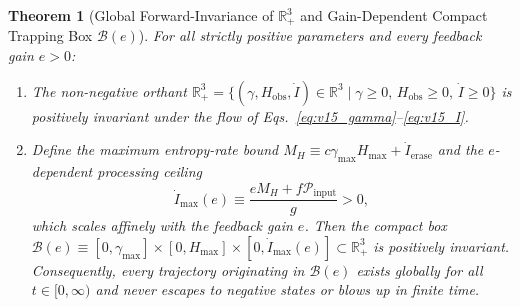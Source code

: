 \documentclass[11pt,a4paper]{article}
\newtheorem{theorem}{Theorem}
\theoremstyle{remark}
\begin{document}
\begin{theorem}[Global Forward-Invariance of $\mathbb{R}^3_+$ and Gain-Dependent Compact Trapping Box $\mathcal{B}(e)$]
\label{thm:global_invariance}
For all strictly positive parameters and every feedback gain $e > 0$:
\begin{enumerate}
\setlength{\itemsep}{1pt}\setlength{\parskip}{0pt}
    \item The non-negative orthant $\mathbb{R}^3_+ = \{(\gamma, H_{\text{obs}}, \dot{I}) \in \mathbb{R}^3 \mid \gamma \ge 0,\, H_{\text{obs}} \ge 0,\, \dot{I} \ge 0\}$ is positively invariant under the flow of Eqs.~\eqref{eq:v15_gamma}--\eqref{eq:v15_I}.
    \item Define the maximum entropy-rate bound $M_H \equiv c\gamma_{\max}H_{\max} + \dot{I}_{\text{erase}}$ and the $e$-dependent processing ceiling
    \begin{equation}
    \label{eq:I_max}
    \dot{I}_{\max}(e) \equiv \frac{e M_H + f\mathcal{P}_{\text{input}}}{g} > 0,
    \end{equation}
    which scales affinely with the feedback gain $e$. Then the compact box $\mathcal{B}(e) \equiv [0, \gamma_{\max}] \times [0, H_{\max}] \times [0, \dot{I}_{\max}(e)] \subset \mathbb{R}^3_+$ is positively invariant. Consequently, every trajectory originating in $\mathcal{B}(e)$ exists globally for all $t \in [0,\infty)$ and never escapes to negative states or blows up in finite time.
\end{enumerate}
\end{theorem}
\end{document}
